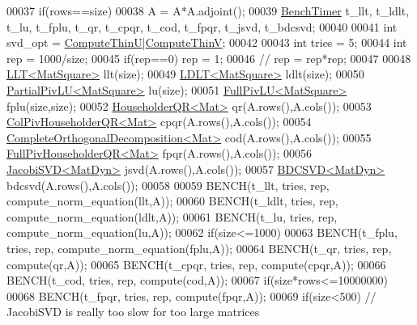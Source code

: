 \begin{DoxyCode}
00037   \textcolor{keywordflow}{if}(rows==size)
00038     A = A*A.adjoint();
00039   \hyperlink{class_eigen_1_1_bench_timer}{BenchTimer} t\_llt, t\_ldlt, t\_lu, t\_fplu, t\_qr, t\_cpqr, t\_cod, t\_fpqr, t\_jsvd, t\_bdcsvd;
00040 
00041   \textcolor{keywordtype}{int} svd\_opt = \hyperlink{group__enums_ggae3e239fb70022eb8747994cf5d68b4a9af8c742a1aa87773e165eae406c9ccaf8}{ComputeThinU}|\hyperlink{group__enums_ggae3e239fb70022eb8747994cf5d68b4a9a1055e53fa95c8ae04a07ebb72cfafd95}{ComputeThinV};
00042   
00043   \textcolor{keywordtype}{int} tries = 5;
00044   \textcolor{keywordtype}{int} rep = 1000/size;
00045   \textcolor{keywordflow}{if}(rep==0) rep = 1;
00046 \textcolor{comment}{//   rep = rep*rep;}
00047   
00048   \hyperlink{group___cholesky___module_class_eigen_1_1_l_l_t}{LLT<MatSquare>} llt(size);
00049   \hyperlink{group___cholesky___module_class_eigen_1_1_l_d_l_t}{LDLT<MatSquare>} ldlt(size);
00050   \hyperlink{group___l_u___module_class_eigen_1_1_partial_piv_l_u}{PartialPivLU<MatSquare>} lu(size);
00051   \hyperlink{group___l_u___module_class_eigen_1_1_full_piv_l_u}{FullPivLU<MatSquare>} fplu(size,size);
00052   \hyperlink{group___q_r___module_class_eigen_1_1_householder_q_r}{HouseholderQR<Mat>} qr(A.rows(),A.cols());
00053   \hyperlink{group___q_r___module_class_eigen_1_1_col_piv_householder_q_r}{ColPivHouseholderQR<Mat>} cpqr(A.rows(),A.cols());
00054   \hyperlink{group___q_r___module_class_eigen_1_1_complete_orthogonal_decomposition}{CompleteOrthogonalDecomposition<Mat>} cod(A.rows(),A.cols());
00055   \hyperlink{group___q_r___module_class_eigen_1_1_full_piv_householder_q_r}{FullPivHouseholderQR<Mat>} fpqr(A.rows(),A.cols());
00056   \hyperlink{group___s_v_d___module_class_eigen_1_1_jacobi_s_v_d}{JacobiSVD<MatDyn>} jsvd(A.rows(),A.cols());
00057   \hyperlink{group___s_v_d___module_class_eigen_1_1_b_d_c_s_v_d}{BDCSVD<MatDyn>} bdcsvd(A.rows(),A.cols());
00058   
00059   BENCH(t\_llt, tries, rep, compute\_norm\_equation(llt,A));
00060   BENCH(t\_ldlt, tries, rep, compute\_norm\_equation(ldlt,A));
00061   BENCH(t\_lu, tries, rep, compute\_norm\_equation(lu,A));
00062   \textcolor{keywordflow}{if}(size<=1000)
00063     BENCH(t\_fplu, tries, rep, compute\_norm\_equation(fplu,A));
00064   BENCH(t\_qr, tries, rep, compute(qr,A));
00065   BENCH(t\_cpqr, tries, rep, compute(cpqr,A));
00066   BENCH(t\_cod, tries, rep, compute(cod,A));
00067   \textcolor{keywordflow}{if}(size*rows<=10000000)
00068     BENCH(t\_fpqr, tries, rep, compute(fpqr,A));
00069   \textcolor{keywordflow}{if}(size<500) \textcolor{comment}{// JacobiSVD is really too slow for too large matrices}

\end{DoxyCode}
